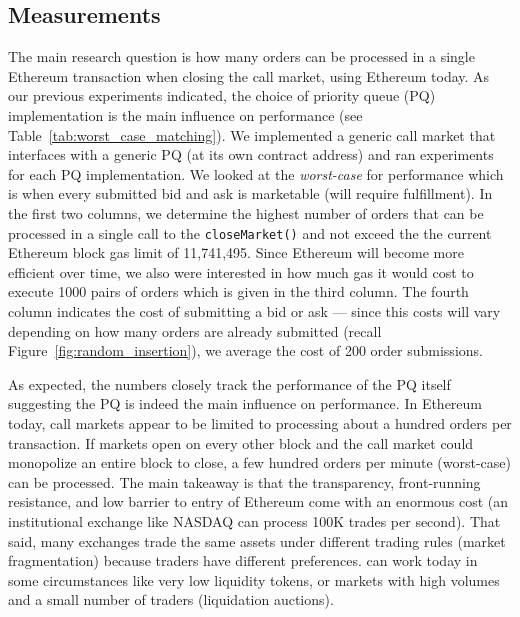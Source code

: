 
 \subsection{Measurements}
 
 
 
 
The main research question is how many orders can be processed in a single Ethereum transaction when closing the call market, using Ethereum today. As our previous experiments indicated, the choice of priority queue (PQ) implementation is the main influence on performance (see Table~\ref{tab:worst_case_matching}). We implemented a generic call market that interfaces with a generic PQ (at its own contract address) and ran experiments for each PQ implementation. We looked at the \textit{worst-case} for performance which is when every submitted bid and ask is marketable (\ie will require fulfillment). In the first two columns, we determine the highest number of orders that can be processed in a single call to the \texttt{closeMarket()} and not exceed the the current Ethereum block gas limit of 11,741,495. Since Ethereum will become more efficient over time, we also were interested in how much gas it would cost to execute 1000 pairs of orders which is given in the third column. The fourth column indicates the cost of submitting a bid or ask --- since this costs will vary depending on how many orders are already submitted (recall Figure~\ref{fig:random_insertion}), we average the cost of 200 order submissions. 

As expected, the numbers closely track the performance of the PQ itself suggesting the PQ is indeed the main influence on performance. In Ethereum today, call markets appear to be limited to processing about a hundred orders per transaction. If markets open on every other block and the call market could monopolize an entire block to close, a few hundred orders per minute (worst-case) can be processed. The main takeaway is that the transparency, front-running resistance, and low barrier to entry of Ethereum come with an enormous cost (\ie an institutional exchange like NASDAQ can process 100K trades per second). That said, many exchanges trade the same assets under different trading rules (\ie market fragmentation) because traders have different preferences. \cm can work today in some circumstances like very low liquidity tokens, or markets with high volumes and a small number of traders (\eg liquidation auctions). 

